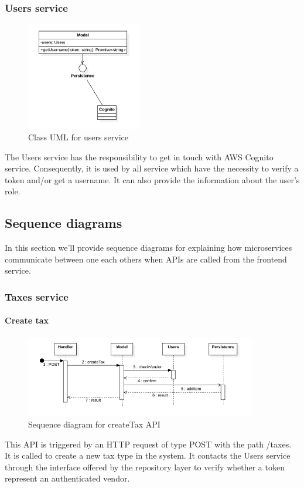 \subsubsection{Users service}
\begin{figure}[H]
    \includegraphics[width=0.45\textwidth]{res/images/class-diagrams/users.png}
    \caption{Class UML for users service}
\end{figure}
The Users service has the responsibility to get in touch with AWS Cognito service. Consequently, it is used by all service which have the necessity to verify
a token and/or get a username. It can also provide the information about the user's role.


\subsection{Sequence diagrams} \label{_sequenceDiagram}
In this section we'll provide sequence diagrams for explaining how microservices communicate between one each others when APIs are called from the frontend service.

\subsubsection{Taxes service}
\paragraph*{Create tax}
\begin{figure}[H]
    \includegraphics[width=0.9\textwidth]{res/images/sequence-diagrams/taxes/createTax.png}
    \caption{Sequence diagram for createTax API}
\end{figure}
This API is triggered by an HTTP request of type POST with the path /taxes. It is called to create a new tax type in the system. It contacts the Users service through the interface offered by the repository layer to verify
whether a token represent an authenticated vendor.

